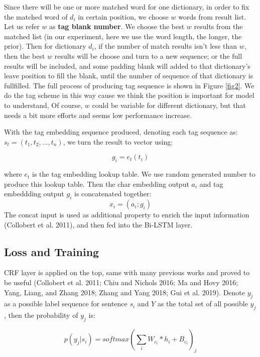 \documentclass[letterpaper]{article} %
\begin{document}
Since there will be one or more matched word for one dictionary, in order to fix the matched word of $d_i$ in certain position, we choose $w$ words from result list. Let us refer $w$ as \textbf{tag blank number}. We choose the best $w$ results from the matched list (in our experiment, here we use the word length, the longer, the prior). Then for dictionary $d_i$, if the number of match results isn't less than $w$, then the best $w$ results will be choose and turn to a new sequence; or the full results will be included, and some padding blank will added to that dictionary's leave position to fill the blank, until the number of sequence of that dictionary is fullfilled.  The full process of producing tag sequence is shown in Figure \ref{fig2}. We do the tag scheme in this way cause we think the position is important for model to understand, Of course, $w$ could be variable for different dictionary, but that needs a bit more efforts and seems low performance increase.

With the tag embedding sequence produced, denoting each tag sequence as: $s_t = (t_1, t_2, ..., t_n)$, we turn the result to vector using: 

\begin{equation}
g_i = e_t(t_i) \label{tag_embedding}
\end{equation}

where $e_t$ is the tag embedding lookup table. We use random generated number to produce this lookup table. Then the char embedding output $a_i$ and tag embeddding output $g_i$ is concatenated together:
\begin{equation}
x_i = (a_i;g_i) \label{concat}
\end{equation}
The concat input is used as additional property to enrich the input information (Collobert et al. 2011), and then fed into the Bi-LSTM layer.  

\subsection{Loss and Training}

CRF layer is applied on the top, same with many previous works and proved to be useful (Collobert et al. 2011; Chiu and Nichols 2016; Ma and Hovy 2016; Yang, Liang, and Zhang 2018; Zhang and Yang 2018; Gui et al. 2019). Denote $y_j$ as a possible label sequence for sentence $s_i$ and $Y$ as the total set of all possible $y_j$, then the probability of $y_j$ is:

\begin{equation}
p(y_j | s_i) = softmax(\sum_i{W_{c_i} * h_i} + B_{c_i})_j
\label{crf_probability}
\end{equation}
\end{document}
